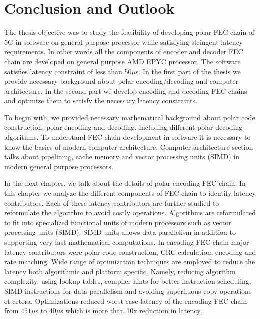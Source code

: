 \chapter{Conclusion and Outlook} \label{chap:conclusion}
The thesis objective was to study the feasibility of developing polar FEC chain of 5G in software on general purpose processor while satisfying stringent latency requirements. In other words all the components of encoder and decoder FEC chain are developed on general purpose AMD EPYC processor. The software satisfies latency constraint of less than 50$\mu$s. In the first part of the thesis we provide necessary background about polar encoding/decoding and computer architecture. In the second part we develop encoding and decoding FEC chains and optimize them to satisfy the necessary latency constraints. \newline

To begin with, we provided necessary mathematical background about polar code construction, polar encoding and decoding. Including different polar decoding algorithms. To understand FEC chain development in software it is necessary to know the basics of modern computer architecture. Computer architecture section talks about pipelining, cache memory and vector processing units (SIMD) in modern general purpose processors. \newline

In the next chapter, we talk about the details of polar encoding FEC chain. In this chapter we analyze the different components of FEC chain to identify latency contributors. Each of these latency contributors are further studied to reformulate the algorithm to avoid costly operations. Algorithms are reformulated to fit into specialized functional units of modern processors such as vector processing units (SIMD). SIMD units allows data parallelism in addition to supporting very fast mathematical computations. In encoding FEC chain major latency contributors were polar code construction, CRC calculation, encoding and rate matching. Wide range of optimization techniques are employed to reduce the latency both algorithmic and platform specific. Namely, reducing algorithm complexity, using lookup tables, compiler hints for better instruction scheduling, SIMD instructions for data parallelism and avoiding superfluous copy operations et cetera. Optimizations reduced worst case latency of the encoding FEC chain from $451 \mu$s to $40\mu$s which is more than 10x reduction in latency. \newline

